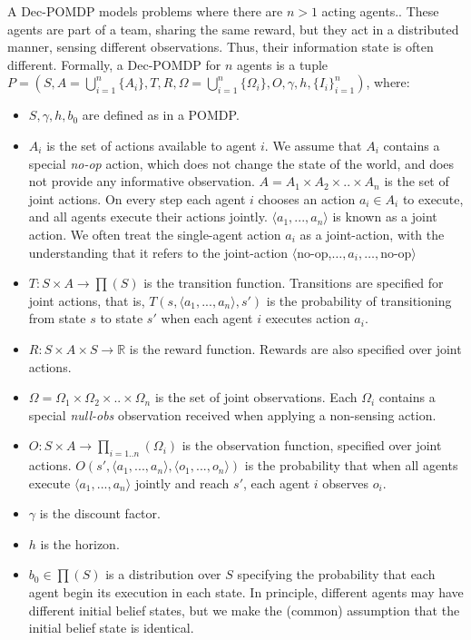 \documentclass[letterpaper]{article} %
\theoremstyle{definition}
\begin{document}
A Dec-POMDP models problems where there are $n>1$ acting agents.. 
These agents are part of a team, sharing the same reward, but they act in a distributed manner,
sensing different observations. Thus, their information state is often different. 
Formally, a Dec-POMDP for $n$ agents is a tuple  $P=(S, A=\bigcup_{i=1}^{n}{\{A_i\}}, T, R, \Omega=\bigcup_{i=1}^{n}{\{\Omega_i\}},  O, \gamma, h, {\{I_i\}}_{i=1}^{n})$, where:
\begin{itemize}
\item
$S,\gamma,h,b_0$ are defined as in a POMDP.
\item
$A_i$ is the set of actions available to agent $i$. We assume that $A_i$ contains a special {\em no-op} action, which does not change the state of the world, and does not provide any informative observation. 
$A=A_1 \times A_2 \times .. \times A_n$ is the set of joint actions. On every step each agent $i$ chooses an action $a_i \in A_i$ to execute, and all agents execute their actions jointly. $\langle a_1,...,a_n \rangle$ is known as a joint action. We often treat the
single-agent action $a_i$ as a joint-action, with the understanding that it refers to the joint-action $\langle$no-op,$\ldots,a_i,\ldots,$no-op$\rangle$
\item
$T:S \times A \rightarrow \prod(S)$  is the transition function. Transitions are specified for joint actions, that is, $T(s, \langle a_1,...,a_n \rangle, s')$ is the probability of transitioning from state $s$ to state $s'$ when each agent $i$ executes action $a_i$.
\item
$R:S \times A \times S \rightarrow \mathbb{R}$  is the reward function. Rewards are also specified over joint actions.
\item
$\Omega = \Omega_1 \times \Omega_2 \times .. \times \Omega_n$ is the set of joint observations. Each $\Omega_i$ contains a special {\em null-obs} observation received when applying a non-sensing action.
\item
$O:S \times A \rightarrow \prod_{i=1..n}(\Omega_i)$  is the observation function, specified over joint actions. $O(s',\langle a_1,...,a_n \rangle,\langle o_1,...,o_n \rangle)$ is the probability that when all agents execute $\langle a_1,...,a_n \rangle$ jointly and reach $s'$, each agent $i$ observes $o_i$.
\item
$\gamma$  is the discount factor.
\item
$h$ is the horizon.
\item
$b_0 \in \prod(S)$ is a distribution over $S$ specifying the probability that each agent begin its execution in each state. In principle, different agents may have different initial belief states, but
we make the (common) assumption that the initial belief state is identical. 
\end{itemize}
\end{document}
